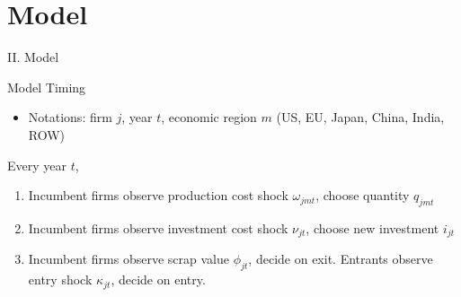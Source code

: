 \documentclass[xcolor=dvipsnames,envcountsect]{beamer}
\begin{document}


\section{Model}

\begin{frame}
\begin{center} 
{\color{sbured}\LARGE II. Model}
\end{center}
\end{frame}

\begin{frame}{Model Timing}
\begin{itemize}
    \item Notations: firm $j$, year $t$, economic region $m$ (US, EU, Japan, China, India, ROW)
\end{itemize}
Every year $t$,
    \begin{enumerate}
        \item Incumbent firms observe production cost shock $\omega_{jmt}$, choose quantity $q_{jmt}$
        \item Incumbent firms observe investment cost shock $\nu_{jt}$, choose new investment $i_{jt}$
        \item Incumbent firms observe scrap value $\phi_{jt}$, decide on exit. Entrants observe entry shock $\kappa_{jt}$, decide on entry.
    \end{enumerate}
\end{frame}
\end{document}
